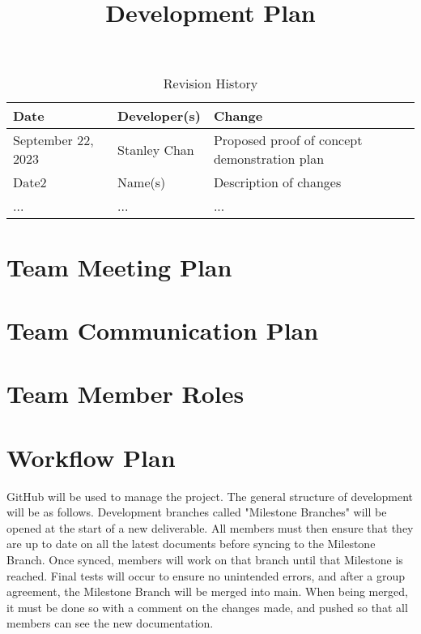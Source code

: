 \documentclass{article}
\title{Development Plan\\\progname}
\author{\authname}
\date{}
\begin{document}
\maketitle

\begin{table}[hp]
\caption{Revision History} \label{TblRevisionHistory}
\begin{tabularx}{\textwidth}{llX}
\toprule
\textbf{Date} & \textbf{Developer(s)} & \textbf{Change}\\
\midrule
September 22, 2023 & Stanley Chan & Proposed proof of concept demonstration plan\\
Date2 & Name(s) & Description of changes\\
... & ... & ...\\
\bottomrule
\end{tabularx}
\end{table}


\section{Team Meeting Plan}

\section{Team Communication Plan}

\section{Team Member Roles}

\section{Workflow Plan}

GitHub will be used to manage the project. The general structure of development will be as follows. Development branches called "Milestone Branches" will be opened at the start of a new deliverable. All members must then ensure that they are up to date on all the latest documents before syncing to the Milestone Branch. Once synced, members will work on that branch until that Milestone is reached. Final tests will occur to ensure no unintended errors, and after a group agreement, the Milestone Branch will be merged into main. When being merged, it must be done so with a comment on the changes made, and pushed so that all members can see the new documentation.
\end{document}
